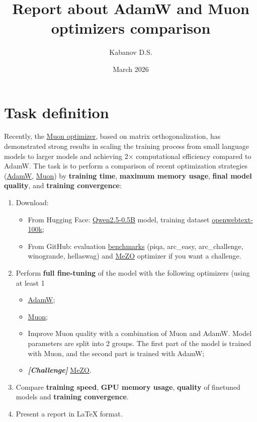 \documentclass{report}
\title{Report about AdamW and Muon optimizers comparison}
\author{Kabanov D.S.}
\date{March 2026}
\begin{document}
\maketitle %

\tableofcontents %

\chapter{Task definition}
Recently, the \href{https://github.com/MoonshotAI/Moonlight}{Muon optimizer}, based on matrix orthogonalization, has demonstrated strong results in scaling the training process from small language models to larger models and achieving 2× computational efficiency compared to AdamW. 
The task is to perform a comparison of recent optimization strategies (\href{https://docs.pytorch.org/docs/stable/generated/torch.optim.AdamW.html}{AdamW}, \href{https://docs.pytorch.org/docs/stable/generated/torch.optim.Muon.html}{Muon}) by \textbf{training time}, \textbf{maximum memory usage}, \textbf{final model quality}, and \textbf{training convergence}:
\begin{enumerate}
    \item Download:
        \begin{itemize}
        \item From Hugging Face: \href{https://huggingface.co/Qwen/Qwen2.5-0.5B}{Qwen2.5-0.5B} model, training dataset \href{https://huggingface.co/datasets/Elriggs/openwebtext-100k}{openwebtext-100k};
        \item From GitHub: evaluation \href{https://github.com/EleutherAI/lm-evaluation-harness}{benchmarks} (piqa, arc\_easy, arc\_challenge, winogrande, hellaswag) and \href{https://github.com/princeton-nlp/MeZO}{MeZO} optimizer if you want a challenge.
        \end{itemize}
    \item Perform \textbf{full fine-tuning} of the model with the following optimizers (using at least 1%
        \begin{itemize}
        \item \href{https://docs.pytorch.org/docs/stable/generated/torch.optim.AdamW.html}{AdamW};
        \item \href{https://docs.pytorch.org/docs/stable/generated/torch.optim.Muon.html}{Muon};
        \item Improve  Muon  quality  with  a  combination  of  Muon  and  AdamW.  Model parameters are split into 2 groups. The first part of the model is trained with Muon, and the second part is trained with AdamW;
        \item \textit{\textbf{[Challenge]}} \href{https://github.com/princeton-nlp/MeZO}{MeZO}.
        \end{itemize}
    \item Compare  \textbf{training speed},  \textbf{GPU memory usage}, \textbf{quality} of finetuned models and \textbf{training convergence}.
    \item Present a report in LaTeX format.
\end{enumerate}
\end{document}
